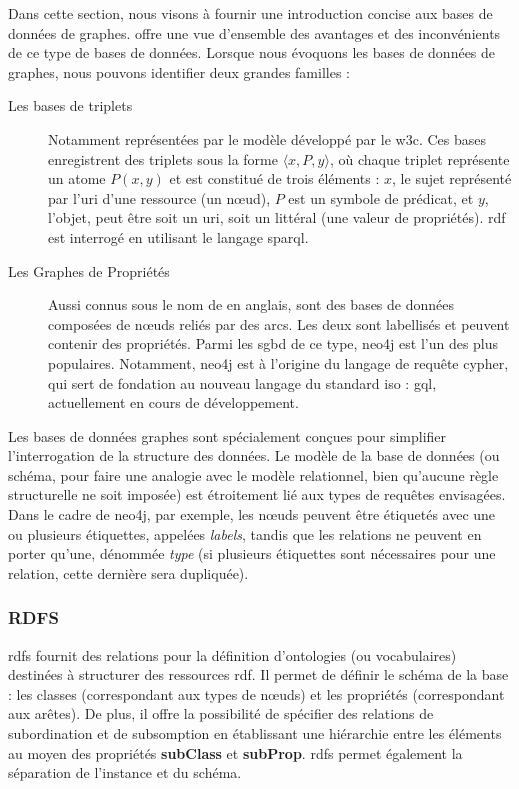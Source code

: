 Dans cette section, nous visons à fournir une introduction concise aux bases de données de graphes.
\cite{pokornyGraphDatabasesTheir2015} offre une vue d'ensemble des avantages et des inconvénients de ce type de bases de données.
Lorsque nous évoquons les bases de données de graphes, nous pouvons identifier deux grandes familles :
\begin{description}
    \item[Les bases de triplets] Notamment représentées par le modèle  développé par le \gls{w3c}.
          Ces bases enregistrent des triplets sous la forme $\langle x, P, y \rangle$, où chaque triplet représente un atome $P(x, y)$ et est constitué de trois éléments : $x$, le sujet représenté par l'\gls{uri} d'une ressource (un nœud), $P$ est un symbole de prédicat, et $y$, l'objet, peut être soit un \gls{uri}, soit un littéral (une valeur de propriétés).
          \acs{rdf} est interrogé en utilisant le langage \gls{sparql}.

    \item[Les Graphes de Propriétés] Aussi connus sous le nom de  en anglais, sont des bases de données composées de nœuds reliés par des arcs. Les deux sont labellisés et peuvent contenir des propriétés.
          Parmi les \gls{sgbd} de ce type, \gls{neo4j} est l'un des plus populaires.
          Notamment, \gls{neo4j} est à l'origine du langage de requête \gls{cypher}, qui sert de fondation au nouveau langage du standard \gls{iso} : \gls{gql}, actuellement en cours de développement.
\end{description}

Les bases de données graphes sont spécialement conçues pour simplifier l'interrogation de la structure des données.
Le modèle de la base de données (ou schéma, pour faire une analogie avec le modèle relationnel, bien qu'aucune règle structurelle ne soit imposée) est étroitement lié aux types de requêtes envisagées.
Dans le cadre de \gls{neo4j}, par exemple, les nœuds peuvent être étiquetés avec une ou plusieurs étiquettes, appelées \emph{labels}, tandis que les relations ne peuvent en porter qu'une, dénommée \emph{type} (si plusieurs étiquettes sont nécessaires pour une relation, cette dernière sera dupliquée).

\subsubsection{RDFS}
\gls{rdfs} fournit des relations pour la définition d'ontologies (ou vocabulaires) destinées à structurer des ressources \gls{rdf}.
Il permet de définir le schéma de la base : les classes (correspondant aux types de nœuds) et les propriétés (correspondant aux arêtes).
De plus, il offre la possibilité de spécifier des relations de subordination et de subsomption en établissant une hiérarchie entre les éléments au moyen des propriétés \textbf{subClass} et \textbf{subProp}.
\gls{rdfs} permet également la séparation de l'instance et du schéma.

